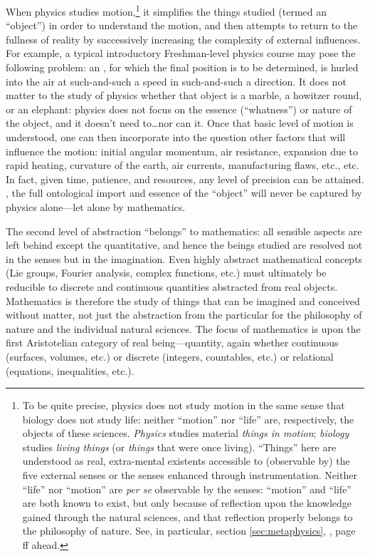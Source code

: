When physics studies motion,\footnote{To be quite precise, physics does not study motion in the same sense that biology does not study life: neither “motion” nor “life” are, respectively, the objects of these sciences. \textit{Physics} studies material \textit{things in motion}; \textit{biology} studies \textit{living things} (or \textit{things} that were once living). ``Things'' here are understood as real, extra-mental existents accessible to (observable by) the five external senses or the senses enhanced through instrumentation. Neither “life” nor “motion” are \textit{per se} observable by the senses: ``motion'' and ``life'' are both known to exist, but only because of reflection upon the knowledge gained through the natural sciences, and that reflection properly belongs to the philosophy of nature. See, in particular, section \ref{sec:metaphysics}, , page \pageref{page:motion}ff ahead.} it simplifies the things studied (termed an ``object'') in order to understand the motion, and then attempts to return to the fullness of reality by successively increasing the complexity of external influences. For example, a typical introductory Freshman-level physics course may pose the following problem: an , for which the final position is to be determined, is hurled into the air at such-and-such a speed in such-and-such a direction. It does not matter to the study of physics whether that object is a marble, a howitzer round, or an elephant: physics does not focus on the essence (``whatness'') or nature of the object, and it doesn't need to\ldots nor can it. Once that basic level of motion is understood, one can then incorporate into the question other factors that will influence the motion: initial angular momentum, air resistance, expansion due to rapid heating, curvature of the earth, air currents, manufacturing flaws, etc., etc. In fact, given time, patience, and resources, any level of precision can be attained. , the full ontological import and essence of the ``object'' will never be captured by physics alone---let alone by mathematics.

The second level of abstraction ``belongs'' to mathematics: all sensible aspects are left behind except the quantitative, and hence the beings studied are resolved not in the senses but in the imagination. Even highly abstract mathematical concepts (Lie groups, Fourier analysis, complex functions, etc.) must ultimately be reducible to discrete and continuous quantities abstracted from real objects. Mathematics is therefore the study of things that can be imagined and conceived without matter, not just the abstraction from the particular for the philosophy of nature and the individual natural sciences. The focus of mathematics is upon the first Aristotelian category of real being---quantity, again whether continuous (surfaces, volumes, etc.) or discrete (integers, countables, etc.) or relational (equations, inequalities, etc.).

